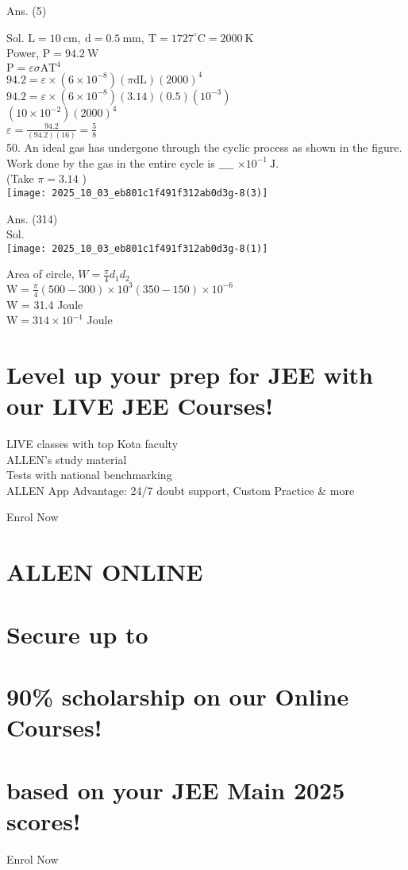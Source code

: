 \documentclass[10pt]{article}
\begin{document}
Ans. (5)

Sol. \(\mathrm{L}=10 \mathrm{~cm}, \mathrm{~d}=0.5 \mathrm{~mm}, \mathrm{~T}=1727^{\circ} \mathrm{C}=2000 \mathrm{~K}\)\\
Power, \(\mathrm{P}=94.2 \mathrm{~W}\)\\
\(\mathrm{P}=\varepsilon \sigma \mathrm{AT}^{4}\)\\
\(94.2=\varepsilon \times\left(6 \times 10^{-8}\right)(\pi \mathrm{dL})(2000)^{4}\)\\
\(94.2=\varepsilon \times\left(6 \times 10^{-8}\right)(3.14)(0.5)\left(10^{-3}\right)\)\\
\(\left(10 \times 10^{-2}\right)(2000)^{4}\)\\
\(\varepsilon=\frac{94.2}{(94.2)(16)}=\frac{5}{8}\)\\
50. An ideal gas has undergone through the cyclic process as shown in the figure. Work done by the gas in the entire cycle is \(\_\_\_\_\) \(\times 10^{-1} \mathrm{~J}\).\\
(Take \(\pi=3.14\) )\\
\texttt{[image: 2025\_10\_03\_eb801c1f491f312ab0d3g-8(3)]}

Ans. (314)\\
Sol.\\
\texttt{[image: 2025\_10\_03\_eb801c1f491f312ab0d3g-8(1)]}

Area of circle, \(W=\frac{\pi}{4} d_{1} d_{2}\)\\
\(\mathrm{W}=\frac{\pi}{4}(500-300) \times 10^{3}(350-150) \times 10^{-6}\)\\
W = 31.4 Joule\\
\(\mathrm{W}=314 \times 10^{-1}\) Joule

\section*{Level up your prep for JEE with our LIVE JEE Courses!}
LIVE classes with top Kota faculty\\
ALLEN's study material\\
Tests with national benchmarking\\
ALLEN App Advantage: 24/7 doubt support, Custom Practice \& more

Enrol Now

\section*{ALLEN ONLINE}
\section*{Secure up to}
\section*{90\% scholarship on our Online Courses!}
\section*{based on your JEE Main 2025 scores!}
Enrol Now
\end{document}
